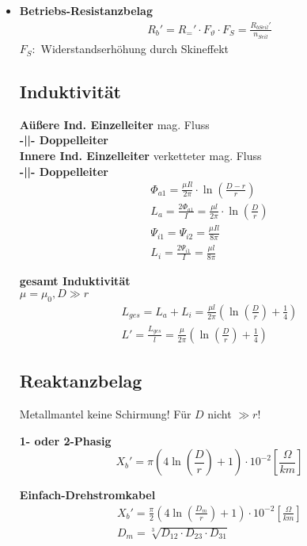 \begin{itemize}
\item[]{\textbf{Betriebs-Resistanzbelag}}
\begin{gather*}
    R_{b}' = R_{=}' \cdot F_{\vartheta} \cdot F_{S} = \frac{R_{b Seil}'}{n_{Seil}}
\end{gather*}
$F_S:$ Widerstandserhöhung durch Skineffekt

\subsection{Induktivität}
\textbf{Aüßere Ind. Einzelleiter} \textcolor{dgreen}{mag. Fluss}\\
\textbf{-||- Doppelleiter}\\
\textbf{Innere Ind. Einzelleiter} \textcolor{dgreen}{verketteter mag. Fluss}\\
\textbf{-||- Doppelleiter}
\begin{gather*}
    \Phi_{a1} = \frac{\mu I l}{2 \pi} \cdot \ln \left( \frac{D-r}{r}\right)\\
    L_{a} = \frac{2\Phi_{a1}}{I} = \frac{\mu l}{2 \pi} \cdot \ln \left( \frac{D}{r}\right)\\
    \Psi_{i1} = \Psi_{i2} = \frac{\mu I l}{8 \pi}\\
    L_{i} = \frac{2\Psi_{i1}}{I} = \frac{\mu l}{8 \pi}
\end{gather*}

\textbf{gesamt Induktivität}\\
\textcolor{dgreen}{$\mu = \mu_{0}, D \gg r$}
\begin{gather*}
    L_{ges} = L_{a} + L_{i} = \frac{\mu l}{2\pi} \left( \ln \left(\frac{D}{r}\right) + \frac{1}{4}\right)\\
    L' = \frac{L_{ges}}{l} = \frac{\mu }{2\pi} \left( \ln \left(\frac{D}{r}\right) + \frac{1}{4}\right)
\end{gather*}

\subsection{Reaktanzbelag}
Metallmantel keine Schirmung! Für $D$ nicht $\gg r$!

\textbf{1- oder 2-Phasig}
\begin{equation*}
    X_{b}' = \pi \left( 4 \ln \left( \frac{D}{r}\right) +1 \right) \cdot 10 ^{-2}   \left[\frac{\Omega}{km}\right]
\end{equation*}

\textbf{Einfach-Drehstromkabel}
\begin{gather*}
    X_{b}' = \frac{\pi}{2} \left( 4 \ln \left( \frac{D_{m}}{r}\right) +1 \right) \cdot 10 ^{-2}   \left[\frac{\Omega}{km}\right]\\
    D_{m} = \sqrt[3]{D_{12} \cdot D_{23} \cdot D_{31}}
\end{gather*}


\end{itemize}
